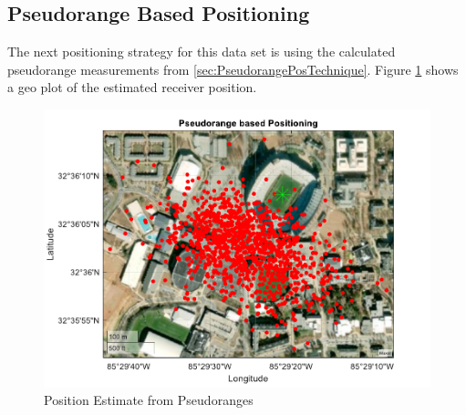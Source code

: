 \documentclass[12pt]{report}
\begin{document}
\subsection{Pseudorange Based Positioning}
The next positioning strategy for this data set is using the calculated pseudorange measurements from \ref{sec:PseudorangePosTechnique}. Figure \ref{fig:CleanPseudo15minIridPosit} shows a geo plot of the estimated receiver position. 
\begin{figure}[h!]
    \centering
    \includegraphics[width=5in]
    {15min_irid_clean_pseudorangebased.pdf}
    \caption{Position Estimate from Pseudoranges}
    \label{fig:CleanPseudo15minIridPosit}
\end{figure}
\end{document}
